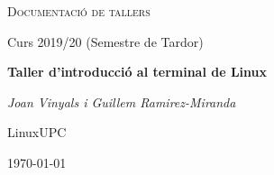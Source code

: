 \makeatletter
\begin{titlepage}
\thispagestyle{empty}
\begin{center}
	\centering
	\vspace{1cm}
	{\scshape\Large Documentació de tallers\par}
	\vspace{0.75cm}
	{\Large Curs 2019/20 (Semestre de Tardor)\par}
	\vspace{0.75cm}
	{\huge\bfseries Taller d'introducció al terminal de Linux\par}
	\vspace{1cm}
	{\Large\itshape Joan Vinyals i Guillem Ramirez-Miranda\par}
    \vspace{0.5cm}
    {\Large LinuxUPC\par}
    \vfill
	{\large \today\par}
\end{center}
\clearpage
\end{titlepage}